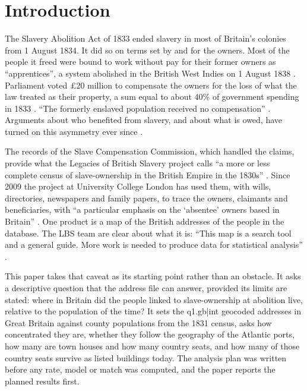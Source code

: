 \documentclass[11pt,a4paper]{article}
\begin{document}
\section{Introduction}\label{sec:intro}
The Slavery Abolition Act of 1833 ended slavery in most of Britain's colonies from 1 August 1834. It did so on terms set by and for the owners. Most of the people it freed were bound to work without pay for their former owners as ``apprentices'', a system abolished in the British West Indies on 1 August 1838 \citep{baker2024,holt1992}. Parliament voted \pounds 20 million to compensate the owners for the loss of what the law treated as their property, a sum equal to about 40\% of government spending in 1833 \citep{baker2024}. ``The formerly enslaved population received no compensation'' \citep{baker2024}. Arguments about who benefited from slavery, and about what is owed, have turned on this asymmetry ever since \citep{williams1944,beckles2013}.

The records of the Slave Compensation Commission, which handled the claims, provide what the Legacies of British Slavery project calls ``a more or less complete census of slave-ownership in the British Empire in the 1830s'' \citep{lbs2026details}. Since 2009 the project at University College London has used them, with wills, directories, newspapers and family papers, to trace the owners, claimants and beneficiaries, with ``a particular emphasis on the `absentee' owners based in Britain'' \citep{lbs2026details,draper2010,hall2014}. One product is a map of the British addresses of the people in the database. The LBS team are clear about what it is: ``This map is a search tool and a general guide. More work is needed to produce data for statistical analysis'' \citep{lbs2026maps}.

This paper takes that caveat as its starting point rather than an obstacle. It asks a descriptive question that the address file can answer, provided its limits are stated: where in Britain did the people linked to slave-ownership at abolition live, relative to the population of the time? It sets the {{q1.gb|int}} geocoded addresses in Great Britain against county populations from the 1831 census, asks how concentrated they are, whether they follow the geography of the Atlantic ports, how many are town houses and how many country seats, and how many of those country seats survive as listed buildings today. The analysis plan was written before any rate, model or match was computed, and the paper reports the planned results first.
\end{document}

